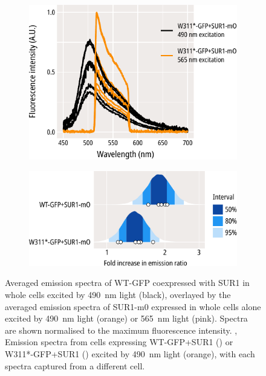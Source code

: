 \begin{figure}[h]
\begin{subfigure}[t]{0.3\textwidth}
		\includegraphics[width=\textwidth]{w311_gfp_mo_spectra_2.pdf}
	\end{subfigure}
	\hfill
	\begin{subfigure}[t]{0.3\textwidth}
		\caption{}\label{ch6fig:gfp_ofp_contrasts_1}
		\centering
		\includegraphics[width=\textwidth]{gfp_ofp_contrasts_1.pdf}
	\end{subfigure}
	\caption[SUR1-mO associates with WT-GFP and W311*-GFP]{
	 Averaged emission spectra of WT-GFP coexpressed with SUR1 in whole cells excited by \SI{490}{\nano\metre} light (black), overlayed by the averaged emission spectra of SUR1-m0 expressed in whole cells alone excited by \SI{490}{\nano\metre} light (orange) or \SI{565}{\nano\metre} light (pink).
	Spectra are shown normalised to the maximum fluorescence intensity.
	,  Emission spectra from cells expressing WT-GFP+SUR1 () or W311*-GFP+SUR1 () excited by \SI{490}{\nano\metre} light (orange), with each spectra captured from a different cell.
}
\end{figure}
